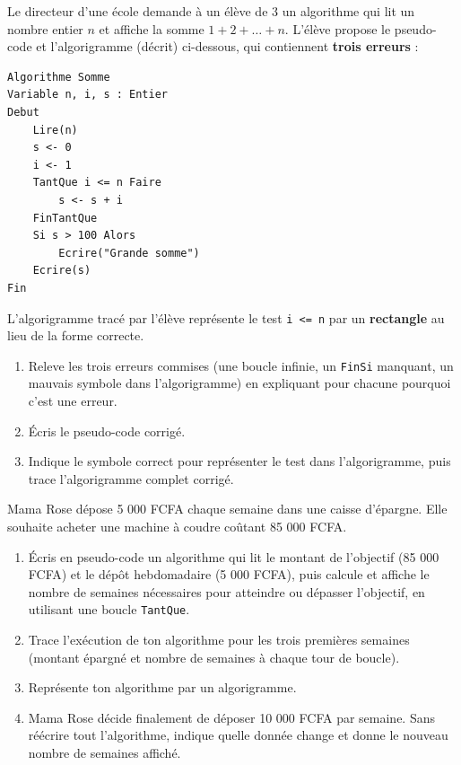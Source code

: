 \documentclass[11pt]{article}
\begin{document}
\begin{exercice}
Le directeur d'une école demande à un élève de 3\ieme{} un algorithme qui lit un nombre entier $n$ et affiche la somme $1 + 2 + \dots + n$. L'élève propose le pseudo-code et l'algorigramme (décrit) ci-dessous, qui contiennent \textbf{trois erreurs} :
\begin{lstlisting}
Algorithme Somme
Variable n, i, s : Entier
Debut
    Lire(n)
    s <- 0
    i <- 1
    TantQue i <= n Faire
        s <- s + i
    FinTantQue
    Si s > 100 Alors
        Ecrire("Grande somme")
    Ecrire(s)
Fin
\end{lstlisting}
L'algorigramme tracé par l'élève représente le test \texttt{i <= n} par un \textbf{rectangle} au lieu de la forme correcte.
\begin{enumerate}
\item Releve les trois erreurs commises (une boucle infinie, un \texttt{FinSi} manquant, un mauvais symbole dans l'algorigramme) en expliquant pour chacune pourquoi c'est une erreur.
\item Écris le pseudo-code corrigé.
\item Indique le symbole correct pour représenter le test dans l'algorigramme, puis trace l'algorigramme complet corrigé.
\end{enumerate}
\end{exercice}

\begin{exercice}
Mama Rose dépose 5 000 FCFA chaque semaine dans une caisse d'épargne. Elle souhaite acheter une machine à coudre coûtant 85 000 FCFA.
\begin{enumerate}
\item Écris en pseudo-code un algorithme qui lit le montant de l'objectif (85 000 FCFA) et le dépôt hebdomadaire (5 000 FCFA), puis calcule et affiche le nombre de semaines nécessaires pour atteindre ou dépasser l'objectif, en utilisant une boucle \texttt{TantQue}.
\item Trace l'exécution de ton algorithme pour les trois premières semaines (montant épargné et nombre de semaines à chaque tour de boucle).
\item Représente ton algorithme par un algorigramme.
\item Mama Rose décide finalement de déposer 10 000 FCFA par semaine. Sans réécrire tout l'algorithme, indique quelle donnée change et donne le nouveau nombre de semaines affiché.
\end{enumerate}
\end{exercice}
\end{document}
